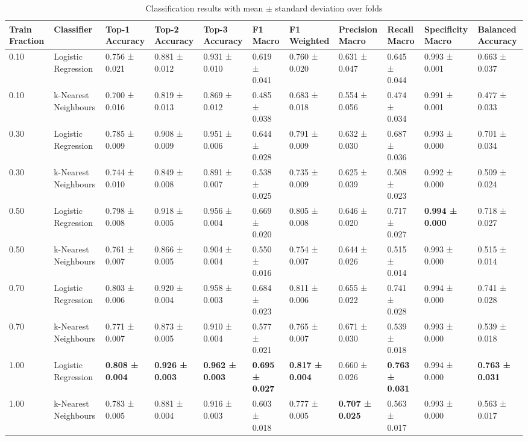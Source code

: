 
\begin{table}[ht]
\centering
\tiny
\caption{Classification results with mean $\pm$ standard deviation over folds}
\label{tab:classification_results}
\begin{tabularx}{\textwidth}{lXXXXXXXXXX}
\toprule
Train Fraction & Classifier & Top-1 Accuracy & Top-2 Accuracy & Top-3 Accuracy & F1 Macro & F1 Weighted & Precision Macro & Recall Macro & Specificity Macro & Balanced Accuracy \\
\midrule
0.10 & Logistic Regression & 0.756 ± 0.021 & 0.881 ± 0.012 & 0.931 ± 0.010 & 0.619 ± 0.041 & 0.760 ± 0.020 & 0.631 ± 0.047 & 0.645 ± 0.044 & 0.993 ± 0.001 & 0.663 ± 0.037 \\
0.10 & k-Nearest Neighbours & 0.700 ± 0.016 & 0.819 ± 0.013 & 0.869 ± 0.012 & 0.485 ± 0.038 & 0.683 ± 0.018 & 0.554 ± 0.056 & 0.474 ± 0.034 & 0.991 ± 0.001 & 0.477 ± 0.033 \\
0.30 & Logistic Regression & 0.785 ± 0.009 & 0.908 ± 0.009 & 0.951 ± 0.006 & 0.644 ± 0.028 & 0.791 ± 0.009 & 0.632 ± 0.030 & 0.687 ± 0.036 & 0.993 ± 0.000 & 0.701 ± 0.034 \\
0.30 & k-Nearest Neighbours & 0.744 ± 0.010 & 0.849 ± 0.008 & 0.891 ± 0.007 & 0.538 ± 0.025 & 0.735 ± 0.009 & 0.625 ± 0.039 & 0.508 ± 0.023 & 0.992 ± 0.000 & 0.509 ± 0.024 \\
0.50 & Logistic Regression & 0.798 ± 0.008 & 0.918 ± 0.005 & 0.956 ± 0.004 & 0.669 ± 0.020 & 0.805 ± 0.008 & 0.646 ± 0.020 & 0.717 ± 0.027 & \textbf{0.994 ± 0.000} & 0.718 ± 0.027 \\
0.50 & k-Nearest Neighbours & 0.761 ± 0.007 & 0.866 ± 0.005 & 0.904 ± 0.004 & 0.550 ± 0.016 & 0.754 ± 0.007 & 0.644 ± 0.026 & 0.515 ± 0.014 & 0.993 ± 0.000 & 0.515 ± 0.014 \\
0.70 & Logistic Regression & 0.803 ± 0.006 & 0.920 ± 0.004 & 0.958 ± 0.003 & 0.684 ± 0.023 & 0.811 ± 0.006 & 0.655 ± 0.022 & 0.741 ± 0.028 & 0.994 ± 0.000 & 0.741 ± 0.028 \\
0.70 & k-Nearest Neighbours & 0.771 ± 0.007 & 0.873 ± 0.005 & 0.910 ± 0.004 & 0.577 ± 0.021 & 0.765 ± 0.007 & 0.671 ± 0.030 & 0.539 ± 0.018 & 0.993 ± 0.000 & 0.539 ± 0.018 \\
1.00 & Logistic Regression & \textbf{0.808 ± 0.004} & \textbf{0.926 ± 0.003} & \textbf{0.962 ± 0.003} & \textbf{0.695 ± 0.027} & \textbf{0.817 ± 0.004} & 0.660 ± 0.026 & \textbf{0.763 ± 0.031} & 0.994 ± 0.000 & \textbf{0.763 ± 0.031} \\
1.00 & k-Nearest Neighbours & 0.783 ± 0.005 & 0.881 ± 0.004 & 0.916 ± 0.003 & 0.603 ± 0.018 & 0.777 ± 0.005 & \textbf{0.707 ± 0.025} & 0.563 ± 0.017 & 0.993 ± 0.000 & 0.563 ± 0.017 \\
\bottomrule
\bottomrule
\end{tabularx}
\end{table}
